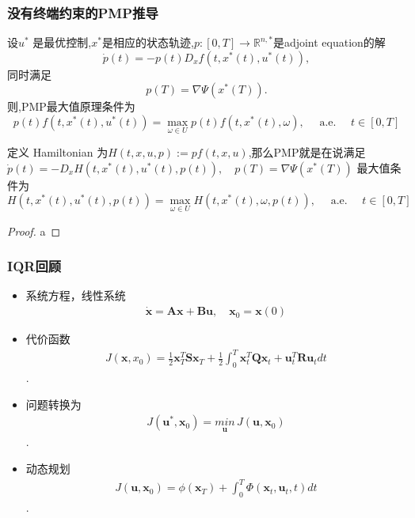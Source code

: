 \documentclass[UTF8, aspectratio=169, 10pt]{ctexbeamer}
\begin{document}
\begin{frame}
\frametitle{没有终端约束的PMP推导 }
\begin{theorem}
  设$u^*$ 是最优控制,$x^*$是相应的状态轨迹,$p:[0,T] \rightarrow \mathbb{R}^{n,*}$是adjoint equation的解
  $$
  \dot{p}(t)=-p(t) D_{x} f\left(t, x^{*}(t), u^{*}(t)\right),
  $$
  同时满足
  $$
  p(T)=\nabla \Psi\left(x^{*}(T)\right).
  $$
  则,PMP最大值原理条件为
  $$
  p(t) f\left(t, x^{*}(t), u^{*}(t)\right)=\max _{\omega \in U} p(t) f\left(t, x^{*}(t), \omega\right), \quad \text { a.e. } \quad t \in[0, T]
  $$
\end{theorem}
定义 Hamiltonian 为$H(t, x, u, p):=p f(t, x, u)$,那么PMP就是在说满足
$
\dot{p}(t)=-D_{x} H\left(t, x^{*}(t), u^{*}(t), p(t)\right), \quad p(T)=\nabla \Psi\left(x^{*}(T)\right)
$
最大值条件为
$$H\left(t, x^{*}(t), u^{*}(t), p(t)\right)=\max _{\omega \in U} H\left(t, x^{*}(t), \omega, p(t)\right), \quad \text { a.e. } \quad t \in[0, T]
$$
\end{frame}

\begin{frame}
\begin{proof}
  a
\end{proof}
\end{frame}

\begin{frame}
  \frametitle{IQR回顾}

  \begin{itemize}
  \item 系统方程，线性系统
    \begin{align}
      \dot{ \boldsymbol{ x } } = \boldsymbol{ A x } + \boldsymbol{ B u }, \quad
      \boldsymbol{x}_0 = \boldsymbol{x}(0)
    \end{align}

  \item 代价函数
    \begin{align}
      J(\boldsymbol{x}, x_0) = \frac{1}{2} \boldsymbol{x}^T_T \boldsymbol{S}
      \boldsymbol{ x }_T + \frac{1}{2} \int_0^T \boldsymbol{x}^T_t
      \boldsymbol{Q} \boldsymbol{x}_t + \boldsymbol{u}^T_t \boldsymbol{R}
      \boldsymbol{u}_t dt
    \end{align}.

  \item 问题转换为
    \begin{align}
      J( \boldsymbol{u}^{*}, \boldsymbol{x}_0 ) = \underset{ \boldsymbol{u}
      }{min}  \, J(
      \boldsymbol{u}, \boldsymbol{x}_0 )
    \end{align}.

  \item 动态规划
    \begin{align}
       J( \boldsymbol{u}, \boldsymbol{x}_0 ) = \phi( \boldsymbol{x}_{T} ) + \int_0^T
      \Phi( \boldsymbol{x}_t,  \boldsymbol{u}_t, t ) dt
    \end{align}.

  \end{itemize}
\end{frame}
\end{document}
